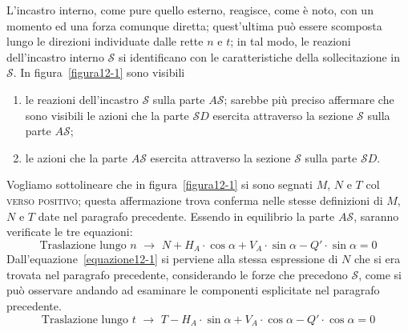 L'incastro interno, come pure quello esterno, reagisce, come è noto, con un momento ed una forza comunque diretta; quest'ultima può essere scomposta lungo le direzioni individuate dalle rette $n$ e $t$; in tal modo, le reazioni dell'incastro interno $\mathcal{S}$ si identificano con le caratteristiche della sollecitazione in $\mathcal{S}$. In figura~\ref{figura12-1} sono visibili
\begin{enumerate}
\item le reazioni dell'incastro $\mathcal{S}$ sulla parte $A\mathcal{S}$; sarebbe più preciso affermare che sono visibili le azioni che la parte $\mathcal{S}D$ esercita attraverso la sezione $\mathcal{S}$ sulla parte $A\mathcal{S}$;
\item le azioni che la parte $A\mathcal{S}$ esercita attraverso la sezione $\mathcal{S}$ sulla parte $\mathcal{S}D$.
\end{enumerate}
Vogliamo sottolineare che in figura~\ref{figura12-1} si sono segnati $M$, $N$ e $T$ col \textsc{verso positivo}; questa affermazione trova conferma nelle stesse definizioni di $M$, $N$ e $T$ date nel paragrafo precedente. Essendo in equilibrio la parte $A\mathcal{S}$, saranno verificate le tre equazioni:
\begin{equation} \label{equazione12-1}
\boxed{ \text{Traslazione lungo } n} \,\, \longrightarrow \,\, N+H_{A}\cdot \cos{\alpha} + V_{A}\cdot \sin{\alpha} - Q' \cdot \sin{\alpha} = 0 \tag{12.1}
\end{equation}
Dall'equazione~\eqref{equazione12-1} si perviene alla stessa espressione di $N$ che si era trovata nel paragrafo precedente, considerando le forze che precedono $\mathcal{S}$, come si può osservare andando ad esaminare le componenti esplicitate nel paragrafo precedente. 
\begin{equation} \label{equazione12-2}
\boxed{ \text{Traslazione lungo } t} \,\, \longrightarrow \,\, T - H_{A}\cdot \sin{\alpha} + V_{A}\cdot \cos{\alpha} - Q'\cdot \cos{\alpha} = 0 \tag{12.2}
\end{equation}
